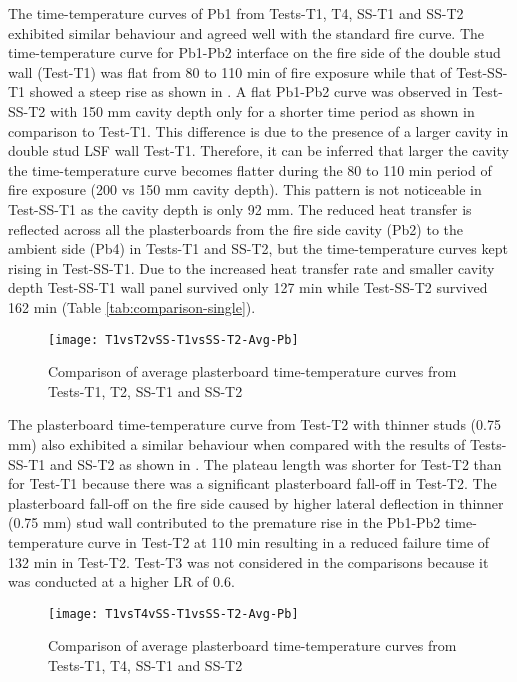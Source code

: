 The time-temperature curves of Pb1 from Tests-T1, T4, SS-T1 and SS-T2 exhibited similar behaviour and agreed well with the standard fire curve. The time-temperature curve for Pb1-Pb2 interface on the fire side of the double stud wall (Test-T1) was flat from 80 to 110 min of fire exposure while that of Test-SS-T1 showed a steep rise as shown in . A flat Pb1-Pb2 curve was observed in Test-SS-T2 with 150 mm cavity depth only for a shorter time period as shown in comparison to Test-T1. This difference is due to the presence of a larger cavity in double stud LSF wall Test-T1. Therefore, it can be inferred that larger the cavity the time-temperature curve becomes flatter during the 80 to 110 min period of fire exposure (200 vs 150 mm cavity depth). This pattern is not noticeable in Test-SS-T1 as the cavity depth is only 92 mm. The reduced heat transfer is reflected across all the plasterboards from the fire side cavity (Pb2) to the ambient side (Pb4) in Tests-T1 and SS-T2, but the time-temperature curves kept rising in Test-SS-T1. Due to the increased heat transfer rate and smaller cavity depth Test-SS-T1 wall panel survived only 127 min while Test-SS-T2 survived 162 min (Table \ref{tab:comparison-single}).
\begin{figure}[!htbp]
	\centering
		\texttt{[image: T1vsT2vSS-T1vsSS-T2-Avg-Pb]}  
	\caption{Comparison of average plasterboard time-temperature curves from Tests-T1, T2, SS-T1 and SS-T2}
	\label{fig:T1vsT2vSS-T1vsSS-T2-Avg-Pb}
\end{figure}

The plasterboard time-temperature curve from Test-T2 with thinner studs (0.75 mm) also exhibited a similar behaviour when compared with the results of Tests-SS-T1 and SS-T2 as shown in . The plateau length was shorter for Test-T2 than for Test-T1 because there was a significant plasterboard fall-off in Test-T2. The plasterboard fall-off on the fire side caused by higher lateral deflection in thinner (0.75 mm) stud wall contributed to the premature rise in the Pb1-Pb2 time-temperature curve in Test-T2 at 110 min resulting in a reduced failure time of 132 min in Test-T2. Test-T3 was not considered in the comparisons because it was conducted at a higher LR of 0.6. 
\begin{figure}[!htbp]
	\centering
		\texttt{[image: T1vsT4vSS-T1vsSS-T2-Avg-Pb]}  
	\caption{Comparison of average plasterboard time-temperature curves from Tests-T1, T4, SS-T1 and SS-T2}
	\label{fig:T1vsT4vSS-T1vsSS-T2-Avg-Pb}
\end{figure}

